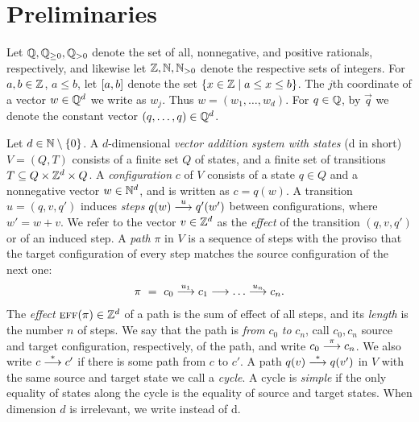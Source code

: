 
\section{Preliminaries}\label{sec:def}

Let $\mathbb{Q}, \mathbb{Q}_{\geq 0}, \mathbb{Q}_{>0}$ denote the set of all, nonnegative, and positive rationals, respectively,
and likewise let $\mathbb{Z}, \mathbb{N}, \mathbb{N}_{>0}$ denote the respective sets of integers.
For $a, b \in \mathbb{Z}$, $a \leq b$, let $[a, b]$ denote the set $\{x \in \mathbb{Z} \mid a \leq x \leq b\}$.
The $j$th coordinate of a vector $w\in\mathbb{Q}^d$ we write as $w_j$.
Thus $w = (w_1, \ldots, w_d)$.
For $q\in \mathbb{Q}$,
by $\vec q$ we denote the constant vector $(q, \ldots, q) \in \mathbb{Q}^d$.


Let $d\in\mathbb{N}\setminus \{0\}$.
A $d$-dimensional \emph{vector addition system with states} (\parvass d in short) $V=(Q,T)$ consists of
a finite set $Q$ of states, and a finite set of transitions $T\subseteq Q\times \mathbb{Z}^d \times Q$.
A \emph{configuration} $c$ of $V$ consists of a state $q\in Q$ and a nonnegative vector $w\in\mathbb{N}^d$,
and is written as $c=q(w)$.
A transition $u=(q,v,q')$ induces \emph{steps} $q(w) \stackrel{u}{\longrightarrow} q'(w')$ between configurations, where $w' = w+v$.
We refer to the vector $v\in\mathbb{Z}^d$ as the \emph{effect} of the transition $(q,v,q')$ or of an induced step.
A \emph{path} $\pi$ in $V$ is a sequence of steps with the proviso that the target configuration of every step matches
the source configuration of the next one:
\begin{align} \label{eq:path}
\pi \ = \ c_0 \stackrel{u_1}{\longrightarrow} c_1 \stackrel{}{\longrightarrow} \ldots \stackrel{u_n}{\longrightarrow} c_n.
\end{align}
The \emph{effect} $\textsc{eff}(\pi)\in\mathbb{Z}^d$
of a path is the sum of effect of all steps, and its \emph{length} is the number $n$ of steps.
We say that the path is \emph{from} $c_0$ \emph{to} $c_n$, call $c_0, c_n$ source and target 
configuration, respectively, of the path, and write $c_0\stackrel{\pi}{\longrightarrow}c_n$.
We also write $c \stackrel{*}{\longrightarrow} c'$ if there is some path from $c$ to $c'$.
A path $q(v) \stackrel{*}{\longrightarrow} q(v')$ in $V$ with the same source and target state
we call a \emph{cycle}.
A cycle is \emph{simple} if the only equality of states along the cycle is the equality of source and target states.
When dimension $d$ is irrelevant, we write \vass instead of \parvass d.

